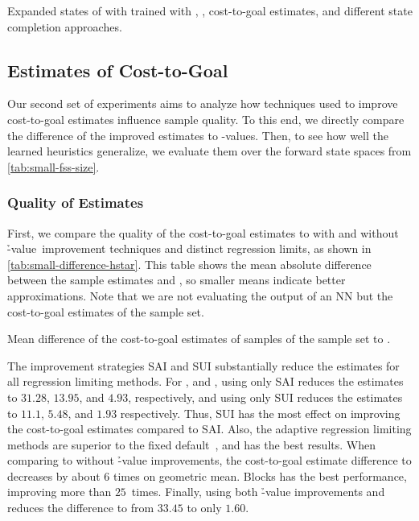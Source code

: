 \begin{table}[tb]
    \caption[Expanded states from different state completion approaches.]{Expanded states of \gbfs with \hnn trained with \bfsrw, \rlmeanfx, \hstar cost-to-goal estimates, and different state completion approaches.}
    \label{tab:small-state-completion}
    \addmargin
    \centering
    
\end{table}

\subsection{Estimates of Cost-to-Goal}
\label{sec:small-exps-hvalue}

Our second set of experiments aims to analyze how techniques used to improve cost-to-goal estimates influence sample quality. To this end, we directly compare the difference of the improved estimates to \hstar-values. Then, to see how well the learned heuristics generalize, we evaluate them over the forward state spaces from \cref{tab:small-fss-size}.

\subsubsection{Quality of Estimates}
\label{sec:small-exps-hvalue-quality}

First, we compare the quality of the cost-to-goal estimates to \hstar with and without \h-value~improvement techniques and distinct regression limits, as shown in \cref{tab:small-difference-hstar}. This table shows the mean absolute difference between the sample estimates and \hstar, so smaller means indicate better approximations. Note that we are not evaluating the output of an NN but the cost-to-goal estimates of the sample set.

\begin{table}[tb]
    \caption[Mean difference of the cost-to-goal estimates to \hstar.]{Mean difference of the cost-to-goal estimates of samples of the sample set to \hstar.}
    \label{tab:small-difference-hstar}
    \addmargin
    \centering
    
\end{table}

The improvement strategies SAI and SUI substantially reduce the estimates for all regression limiting methods. For \rldefault, \rlfacts and \rlmeanfx, using only SAI reduces the estimates to $31.28$, $13.95$, and $4.93$, respectively, and using only SUI reduces the estimates to $11.1$, $5.48$, and $1.93$ respectively. Thus, SUI has the most effect on improving the cost-to-goal estimates compared to SAI.
Also, the adaptive regression limiting methods are superior to the fixed default~\rldefault, and \rlmeanfx has the best results. When comparing \rldefault to \rlmeanfx without \h-value improvements, the cost-to-goal estimate difference to \hstar decreases by about $6$ times on geometric mean. Blocks has the best performance, improving more than $25$~times. Finally, using both \h-value improvements and \rlmeanfx reduces the difference to \hstar from $33.45$ to only $1.60$.

